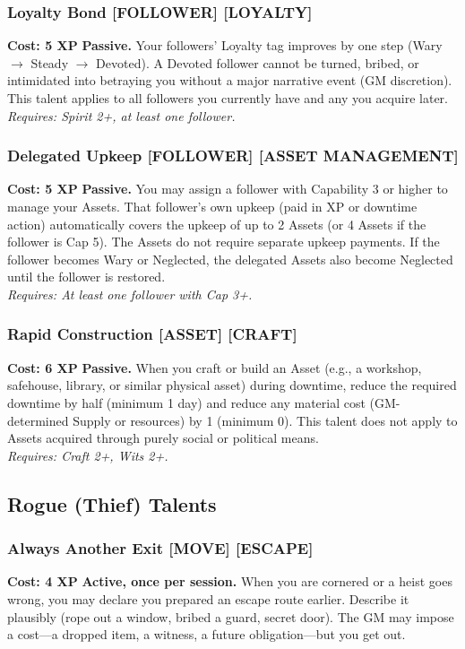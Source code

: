 \subsubsection*{Loyalty Bond \textnormal{[FOLLOWER] [LOYALTY]}}
\label{talent:loyalty-bond}
\textbf{Cost: 5 XP} \textbf{Passive.} Your followers' Loyalty tag improves by one step (Wary $\rightarrow$ Steady $\rightarrow$ Devoted). A Devoted follower cannot be turned, bribed, or intimidated into betraying you without a major narrative event (GM discretion). This talent applies to all followers you currently have and any you acquire later. \\
\textit{Requires: Spirit 2+, at least one follower.}

\subsubsection*{Delegated Upkeep \textnormal{[FOLLOWER] [ASSET MANAGEMENT]}}
\label{talent:delegated-upkeep}
\textbf{Cost: 5 XP} \textbf{Passive.} You may assign a follower with Capability 3 or higher to manage your Assets. That follower's own upkeep (paid in XP or downtime action) automatically covers the upkeep of up to 2 Assets (or 4 Assets if the follower is Cap 5). The Assets do not require separate upkeep payments. If the follower becomes Wary or Neglected, the delegated Assets also become Neglected until the follower is restored. \\
\textit{Requires: At least one follower with Cap 3+.}

\subsubsection*{Rapid Construction \textnormal{[ASSET] [CRAFT]}}
\label{talent:rapid-construction}
\textbf{Cost: 6 XP} \textbf{Passive.} When you craft or build an Asset (e.g., a workshop, safehouse, library, or similar physical asset) during downtime, reduce the required downtime by half (minimum 1 day) and reduce any material cost (GM-determined Supply or resources) by 1 (minimum 0). This talent does not apply to Assets acquired through purely social or political means. \\
\textit{Requires: Craft 2+, Wits 2+.}

\subsection*{Rogue (Thief) Talents}
\label{sec:major-rogue}

\subsubsection*{Always Another Exit \textnormal{[MOVE] [ESCAPE]}}
\label{talent:always-another-exit}
\textbf{Cost: 4 XP} \textbf{Active, once per session.} When you are cornered or a heist goes wrong, you may declare you prepared an escape route earlier. Describe it plausibly (rope out a window, bribed a guard, secret door). The GM may impose a cost---a dropped item, a witness, a future obligation---but you get out.

